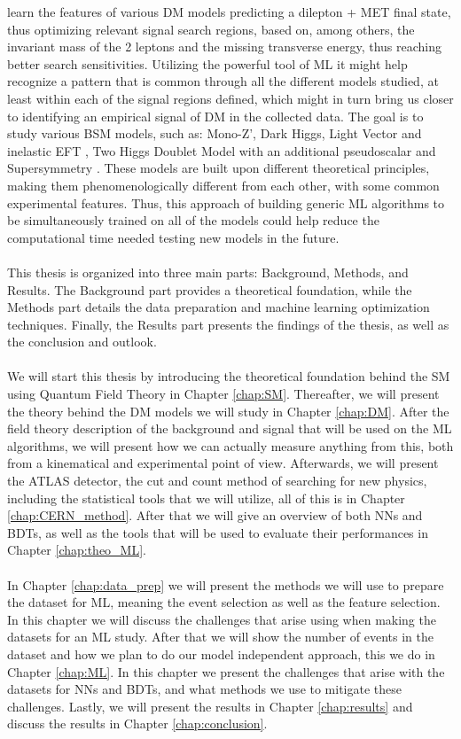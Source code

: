 \documentclass[12pt, a4paper]{book}
\begin{document}
learn the features of various DM models predicting a dilepton + MET final state, thus optimizing relevant signal search regions, based on, among others, the invariant mass of the 2 leptons and the missing transverse energy, thus reaching better search sensitivities. 
Utilizing the powerful tool of ML it might help recognize a pattern that is common through all the different models studied, at least within each of the signal regions defined, which might in turn bring us closer to identifying an empirical signal of DM in the collected data. 
The goal is to study various BSM models, such as: Mono-Z', Dark Higgs, Light Vector and inelastic EFT \cite{Zp_DM_candidate2}, Two Higgs Doublet Model with an additional pseudoscalar \cite{article} and Supersymmetry \cite{JUNGMAN1996195}. 
These models are built upon different theoretical principles, making them phenomenologically different from each other, with some common experimental features. Thus, this approach of building generic ML algorithms to be simultaneously trained on all of the models 
could help reduce the computational time needed testing new models in the future.\\
\\This thesis is organized into three main parts: Background, Methods, and Results. The Background part provides a theoretical foundation, while the Methods part details the data preparation and machine learning optimization techniques. 
Finally, the Results part presents the findings of the thesis, as well as the conclusion and outlook.\\
\\We will start this thesis by introducing the theoretical foundation behind the SM using Quantum Field Theory in Chapter \ref{chap:SM}. Thereafter, we will present the theory behind the DM models we will study in Chapter \ref{chap:DM}. After the field theory description of the background and signal that will be used 
on the ML algorithms, we will present how we can actually measure anything from this, both from a kinematical and experimental point of view. Afterwards, we will present the ATLAS detector, the cut and count method of searching for new physics, including the statistical 
tools that we will utilize, all of this is in Chapter \ref{chap:CERN_method}. After that we will give an overview of both NNs and BDTs, as well as the tools that will be used to evaluate their performances in Chapter \ref{chap:theo_ML}.\\
\\In Chapter \ref{chap:data_prep} we will present the methods we will use to prepare the dataset for ML, meaning the event selection as well as the feature selection. In this chapter we will discuss the challenges that arise using when making the datasets for an ML study. After that we will show the number of events in the dataset and 
how we plan to do our model independent approach, this we do in Chapter \ref{chap:ML}. In this chapter we present the challenges that arise with the datasets for NNs and BDTs, and what methods we use to mitigate these challenges. Lastly, we will present the results in Chapter \ref{chap:results} 
and discuss the results in Chapter \ref{chap:conclusion}.
\end{document}
